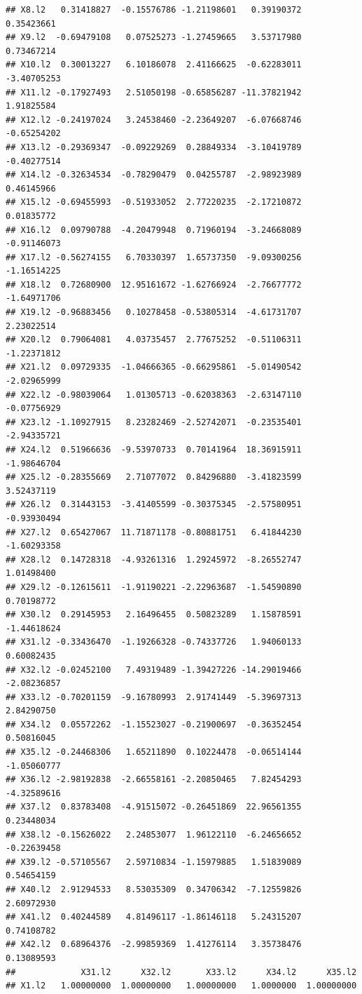\documentclass[]{article}
\begin{document}
\begin{verbatim}
## X8.l2   0.31418827  -0.15576786 -1.21198601   0.39190372  0.35423661
## X9.l2  -0.69479108   0.07525273 -1.27459665   3.53717980  0.73467214
## X10.l2  0.30013227   6.10186078  2.41166625  -0.62283011 -3.40705253
## X11.l2 -0.17927493   2.51050198 -0.65856287 -11.37821942  1.91825584
## X12.l2 -0.24197024   3.24538460 -2.23649207  -6.07668746 -0.65254202
## X13.l2 -0.29369347  -0.09229269  0.28849334  -3.10419789 -0.40277514
## X14.l2 -0.32634534  -0.78290479  0.04255787  -2.98923989  0.46145966
## X15.l2 -0.69455993  -0.51933052  2.77220235  -2.17210872  0.01835772
## X16.l2  0.09790788  -4.20479948  0.71960194  -3.24668089 -0.91146073
## X17.l2 -0.56274155   6.70330397  1.65737350  -9.09300256 -1.16514225
## X18.l2  0.72680900  12.95161672 -1.62766924  -2.76677772 -1.64971706
## X19.l2 -0.96883456   0.10278458 -0.53805314  -4.61731707  2.23022514
## X20.l2  0.79064081   4.03735457  2.77675252  -0.51106311 -1.22371812
## X21.l2  0.09729335  -1.04666365 -0.66295861  -5.01490542 -2.02965999
## X22.l2 -0.98039064   1.01305713 -0.62038363  -2.63147110 -0.07756929
## X23.l2 -1.10927915   8.23282469 -2.52742071  -0.23535401 -2.94335721
## X24.l2  0.51966636  -9.53970733  0.70141964  18.36915911 -1.98646704
## X25.l2 -0.28355669   2.71077072  0.84296880  -3.41823599  3.52437119
## X26.l2  0.31443153  -3.41405599 -0.30375345  -2.57580951 -0.93930494
## X27.l2  0.65427067  11.71871178 -0.80881751   6.41844230 -1.60293358
## X28.l2  0.14728318  -4.93261316  1.29245972  -8.26552747  1.01498400
## X29.l2 -0.12615611  -1.91190221 -2.22963687  -1.54590890  0.70198772
## X30.l2  0.29145953   2.16496455  0.50823289   1.15878591 -1.44618624
## X31.l2 -0.33436470  -1.19266328 -0.74337726   1.94060133  0.60082435
## X32.l2 -0.02452100   7.49319489 -1.39427226 -14.29019466 -2.08236857
## X33.l2 -0.70201159  -9.16780993  2.91741449  -5.39697313  2.84290750
## X34.l2  0.05572262  -1.15523027 -0.21900697  -0.36352454  0.50816045
## X35.l2 -0.24468306   1.65211890  0.10224478  -0.06514144 -1.05060777
## X36.l2 -2.98192838  -2.66558161 -2.20850465   7.82454293 -4.32589616
## X37.l2  0.83783408  -4.91515072 -0.26451869  22.96561355  0.23448034
## X38.l2 -0.15626022   2.24853077  1.96122110  -6.24656652 -0.22639458
## X39.l2 -0.57105567   2.59710834 -1.15979885   1.51839089  0.54654159
## X40.l2  2.91294533   8.53035309  0.34706342  -7.12559826  2.60972930
## X41.l2  0.40244589   4.81496117 -1.86146118   5.24315207  0.74108782
## X42.l2  0.68964376  -2.99859369  1.41276114   3.35738476  0.13089593
##             X31.l2      X32.l2       X33.l2      X34.l2      X35.l2
## X1.l2   1.00000000  1.00000000   1.00000000   1.0000000  1.00000000

\end{verbatim}
\end{document}
